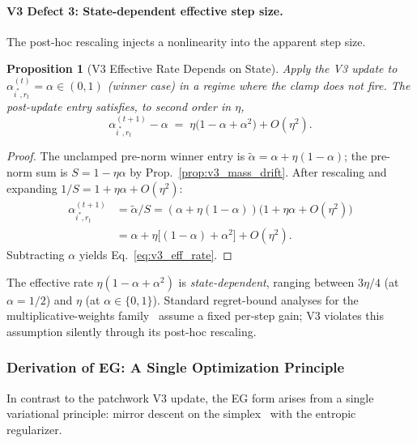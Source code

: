 \documentclass[11pt,a4paper]{article}
\theoremstyle{definition}
\theoremstyle{plain}
\newtheorem{proposition}{Proposition}[section]
\begin{document}
\paragraph{V3 Defect 3: State-dependent effective step size.}
The post-hoc rescaling injects a nonlinearity into the apparent step size.

\begin{proposition}[V3 Effective Rate Depends on State]
\label{prop:v3_eff_rate}
Apply the V3 update to $\alpha_{i^*,r_t}^{(t)} = \alpha \in (0,1)$ (winner
case) in a regime where the clamp does not fire. The post-update entry
satisfies, to second order in $\eta$,
\begin{equation}
\label{eq:v3_eff_rate}
\alpha_{i^*,r_t}^{(t+1)} - \alpha
\;=\; \eta\bigl(1 - \alpha + \alpha^2\bigr) + O(\eta^2).
\end{equation}
\end{proposition}

\begin{proof}
The unclamped pre-norm winner entry is $\tilde{\alpha} = \alpha + \eta(1-\alpha)$;
the pre-norm sum is $S = 1 - \eta\alpha$ by Prop.~\ref{prop:v3_mass_drift}.
After rescaling and expanding $1/S = 1 + \eta\alpha + O(\eta^2)$:
\begin{align*}
\alpha_{i^*,r_t}^{(t+1)}
&= \tilde{\alpha} / S
= (\alpha + \eta(1-\alpha))\bigl(1 + \eta\alpha + O(\eta^2)\bigr)\\
&= \alpha + \eta\bigl[(1 - \alpha) + \alpha^2\bigr] + O(\eta^2).
\end{align*}
Subtracting $\alpha$ yields Eq.~\eqref{eq:v3_eff_rate}.
\end{proof}

\noindent The effective rate $\eta(1 - \alpha + \alpha^2)$ is
\emph{state-dependent}, ranging between $3\eta/4$ (at $\alpha = 1/2$)
and $\eta$ (at $\alpha \in \{0, 1\}$). Standard regret-bound analyses
for the multiplicative-weights family~\cite{arora2012multiplicative,
cesa2006prediction} assume a fixed per-step gain; V3 violates this
assumption silently through its post-hoc rescaling.

\subsubsection*{Derivation of EG: A Single Optimization Principle}

In contrast to the patchwork V3 update, the EG form arises from a
single variational principle: mirror descent on the
simplex~\cite{nemirovski1983problem, beck2003mirror} with the entropic
regularizer.
\end{document}
